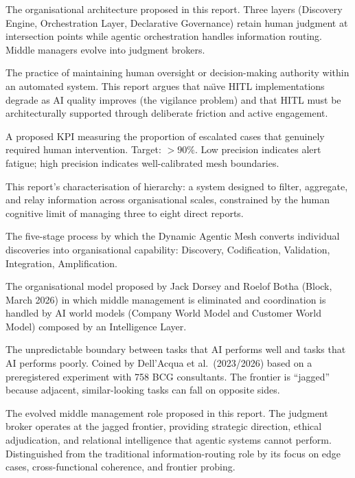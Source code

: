 \begin{description}[style=nextline, leftmargin=2em, font=\bfseries\color{navyblue}]
\item[Dynamic Agentic Mesh]
The organisational architecture proposed in this report. Three layers (Discovery Engine, Orchestration Layer, Declarative Governance) retain human judgment at intersection points while agentic orchestration handles information routing. Middle managers evolve into judgment brokers.

\item[HITL (Human-in-the-Loop)]
The practice of maintaining human oversight or decision-making authority within an automated system. This report argues that na\"{\i}ve HITL implementations degrade as AI quality improves (the vigilance problem) and that HITL must be architecturally supported through deliberate friction and active engagement.

\item[HITL Precision (HP)]
A proposed KPI measuring the proportion of escalated cases that genuinely required human intervention. Target: $>90\%$. Low precision indicates alert fatigue; high precision indicates well-calibrated mesh boundaries.

\item[Information Routing Protocol]
This report's characterisation of hierarchy: a system designed to filter, aggregate, and relay information across organisational scales, constrained by the human cognitive limit of managing three to eight direct reports.

\item[Insight Ingestion Loop]
The five-stage process by which the Dynamic Agentic Mesh converts individual discoveries into organisational capability: Discovery, Codification, Validation, Integration, Amplification.

\item[Intelligence Layer]
The organisational model proposed by Jack Dorsey and Roelof Botha (Block, March 2026) in which middle management is eliminated and coordination is handled by AI world models (Company World Model and Customer World Model) composed by an Intelligence Layer.

\item[Jagged Frontier]
The unpredictable boundary between tasks that AI performs well and tasks that AI performs poorly. Coined by Dell'Acqua et al.\ (2023/2026) based on a preregistered experiment with 758 BCG consultants. The frontier is ``jagged'' because adjacent, similar-looking tasks can fall on opposite sides.

\item[Judgment Broker]
The evolved middle management role proposed in this report. The judgment broker operates at the jagged frontier, providing strategic direction, ethical adjudication, and relational intelligence that agentic systems cannot perform. Distinguished from the traditional information-routing role by its focus on edge cases, cross-functional coherence, and frontier probing.


\end{description}
